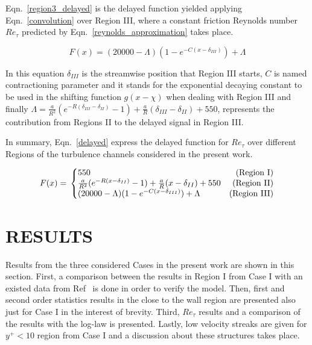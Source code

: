 \documentclass[twocolumn,10pt]{asme2e}
\begin{document}
Eqn.~\ref{region3_delayed} is the delayed function yielded applying Eqn.~\ref{convolution} over Region III, where a constant friction Reynolds number \(Re_{\tau}\) predicted by Eqn.~\ref{reynolds_approximation} takes place.

\begin{equation}
F(x)= (20000-{\Lambda})(1-e^{-C(x-{\delta}_{III})})+{\Lambda}
\label{region3_delayed}
\end{equation}

In this equation \({\delta}_{III}\) is the streamwise position that Region III starts, \(C\) is named contractioning parameter and it stands for the exponential decaying constant to be used in the shifting function \(g(x-\chi)\) when dealing with Region III and finally
 \({\Lambda}=\frac{a}{R^2}(e^{-R({\delta}_{III}-{\delta}_{II})}-1)+\frac{a}{R}({\delta}_{III}-{\delta}_{II})+550\), represents the contribution from Regions II to the delayed signal in Region III.

In summary, Eqn.~\ref{delayed} express the delayed function for \(Re_{\tau}\) over different Regions of the turbulence channels considered in the present work. 

\begin{equation} \label{delayed}
F(x) = \\
    \left\{\begin{array}{@{}lr@{}}
        550  & \text{(Region I)}\\
        \frac{a}{R^2}(e^{-R(x-{\delta}_{II})}-1)+\frac{a}{R}(x-{\delta}_{II})+550 & \text{(Region II)}\\
        (20000-{\Lambda})(1-e^{-C(x-{\delta}_{III})})+{\Lambda} &  \text{(Region III)}
\end{array}\right.
\end{equation}




\section*{RESULTS}

Results from the three considered Cases in the present work are shown in this section. First, a comparison between the results in Region I from Case I with an existed data from Ref~\cite{iwamoto2002} is done in order to verify the model. Then, first and second order statistics results in the close to the wall region are presented also just for Case I in the interest of brevity. Third, \(Re_{\tau}\) results and a comparison of the results with the log-law is presented. Lastly, low velocity streaks are given for \(y^+<10\) region from Case I and a discussion about these structures takes place.
\end{document}
